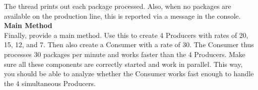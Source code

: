 \begin{oefening}
The thread prints out each package processed. Also, when no packages are available on the production line, this is reported via a message in the console.
\\
\textbf{Main Method}\\
Finally, provide a main method. Use this to create 4 Producers with rates of 20, 15, 12, and 7. Then also create a Consumer with a rate of 30. The Consumer thus processes 30 packages per minute and works faster than the 4 Producers.
Make sure all these components are correctly started and work in parallel. This way, you should be able to analyze whether the Consumer works fast enough to handle the 4 simultaneous Producers.
\end{oefening}
